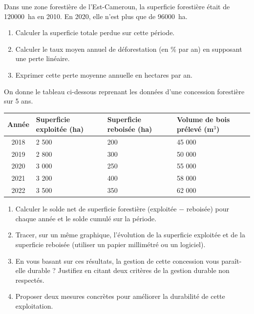 \documentclass[11pt]{article}
\newcounter{popsec}
\newcounter{popsub}
\newcommand{\courssub}[1]{%
  \stepcounter{popsub}%
  \par\vspace{9pt}\noindent{\popxbold\fontsize{11.5}{13}\selectfont\color{popink}{\color{poporange}\thepopsec.\thepopsub}\hspace{6pt}#1}\par\nopagebreak\vspace{4pt}
}
\begin{document}
\begin{exercice}
Dans une zone forestière de l'Est-Cameroun, la superficie forestière était de \SI{120 000}{ha} en 2010. En 2020, elle n'est plus que de \SI{96 000}{ha}.
\begin{enumerate}
\item Calculer la superficie totale perdue sur cette période.
\item Calculer le taux moyen annuel de déforestation (en \% par an) en supposant une perte linéaire.
\item Exprimer cette perte moyenne annuelle en hectares par an.
\end{enumerate}
\end{exercice}

\courssub{Je m'entraîne}

\begin{exercice}
On donne le tableau ci-dessous reprenant les données d'une concession forestière sur 5 ans.

\begin{center}
\begin{tabularx}{\linewidth}{|c|X|X|X|}\hline
\textbf{Année} & \textbf{Superficie exploitée (ha)} & \textbf{Superficie reboisée (ha)} & \textbf{Volume de bois prélevé (m$^3$)} \\ \hline
2018 & 2 500 & 200 & 45 000 \\ \hline
2019 & 2 800 & 300 & 50 000 \\ \hline
2020 & 3 000 & 250 & 55 000 \\ \hline
2021 & 3 200 & 400 & 58 000 \\ \hline
2022 & 3 500 & 350 & 62 000 \\ \hline
\end{tabularx}
\end{center}

\begin{enumerate}
\item Calculer le solde net de superficie forestière (exploitée $-$ reboisée) pour chaque année et le solde cumulé sur la période.
\item Tracer, sur un même graphique, l'évolution de la superficie exploitée et de la superficie reboisée (utiliser un papier millimétré ou un logiciel).
\item En vous basant sur ces résultats, la gestion de cette concession vous paraît-elle durable ? Justifiez en citant deux critères de la gestion durable non respectés.
\item Proposer deux mesures concrètes pour améliorer la durabilité de cette exploitation.
\end{enumerate}
\end{exercice}
\end{document}
